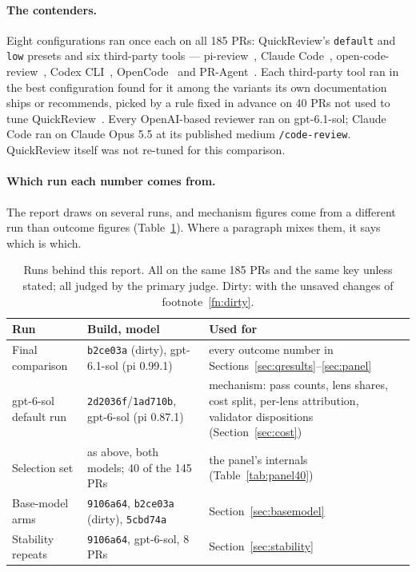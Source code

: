 \documentclass[11pt,a4paper]{article}
\newcommand{\qcr}{QuickReview}
\newcommand{\code}[1]{\texttt{#1}}
\begin{document}
\paragraph{The contenders.} Eight configurations ran once each on all 185
PRs: \qcr{}'s \code{default} and \code{low} presets and six third-party tools
--- pi-review~\cite{pireview}, Claude Code~\cite{claudecode},
open-code-review~\cite{ocr}, Codex CLI~\cite{codex}, OpenCode~\cite{opencode}
and PR-Agent~\cite{pragent}. Each third-party tool ran in the best
configuration found for it among the variants its own documentation ships
or recommends, picked by a rule fixed in advance on 40 PRs not used to tune
\qcr{}~\cite{qcrbench}. Every OpenAI-based reviewer ran on gpt-6.1-sol;
Claude Code ran on Claude Opus 5.5 at its published medium
\code{/code-review}. \qcr{} itself was not re-tuned for this comparison.

\paragraph{Which run each number comes from.} The report draws on several
runs, and mechanism figures come from a different run than outcome figures
(Table~\ref{tab:sources}). Where a paragraph mixes them, it says which is
which.

\begin{table}[!tbp]
\centering
\small
\caption{Runs behind this report. All on the same 185 PRs and the same key
unless stated; all judged by the primary judge. Dirty: with the unsaved
changes of footnote~\ref{fn:dirty}.}
\label{tab:sources}
\begin{tabularx}{\textwidth}{@{}l l X@{}}
\toprule
Run & Build, model & Used for \\
\midrule
Final comparison & \code{b2ce03a} (dirty), gpt-6.1-sol (pi 0.99.1) & every outcome number in Sections~\ref{sec:qresults}--\ref{sec:panel} \\
gpt-6-sol default run & \code{2d2036f}/\code{1ad710b}, gpt-6-sol (pi 0.87.1) & mechanism: pass counts, lens shares, cost split, per-lens attribution, validator dispositions (Section~\ref{sec:cost}) \\
Selection set & as above, both models; 40 of the 145 PRs & the panel's internals (Table~\ref{tab:panel40}) \\
Base-model arms & \code{9106a64}, \code{b2ce03a} (dirty), \code{5cbd74a} & Section~\ref{sec:basemodel} \\
Stability repeats & \code{9106a64}, gpt-6-sol, 8 PRs & Section~\ref{sec:stability} \\
\bottomrule
\end{tabularx}
\end{table}
\end{document}
